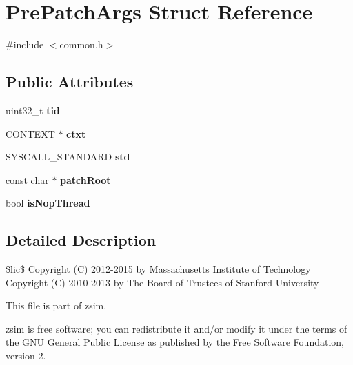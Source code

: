 \hypertarget{structPrePatchArgs}{\section{Pre\-Patch\-Args Struct Reference}
\label{structPrePatchArgs}
}


{\ttfamily \#include $<$common.\-h$>$}

\subsection*{Public Attributes}
\begin{DoxyCompactItemize}
\item 
\hypertarget{structPrePatchArgs_a49fba3fbedfef437698f149b07a60361}{uint32\-\_\-t {\bfseries tid}}\label{structPrePatchArgs_a49fba3fbedfef437698f149b07a60361}

\item 
\hypertarget{structPrePatchArgs_affd3d4a3b3601033eea574e76b12743b}{C\-O\-N\-T\-E\-X\-T $\ast$ {\bfseries ctxt}}\label{structPrePatchArgs_affd3d4a3b3601033eea574e76b12743b}

\item 
\hypertarget{structPrePatchArgs_a3fecf0e133ece9160b17ad82d711667b}{S\-Y\-S\-C\-A\-L\-L\-\_\-\-S\-T\-A\-N\-D\-A\-R\-D {\bfseries std}}\label{structPrePatchArgs_a3fecf0e133ece9160b17ad82d711667b}

\item 
\hypertarget{structPrePatchArgs_a42e1c776fb67eb8879f9e8b412bd559c}{const char $\ast$ {\bfseries patch\-Root}}\label{structPrePatchArgs_a42e1c776fb67eb8879f9e8b412bd559c}

\item 
\hypertarget{structPrePatchArgs_a54552ce242df01215b66292a16b84156}{bool {\bfseries is\-Nop\-Thread}}\label{structPrePatchArgs_a54552ce242df01215b66292a16b84156}

\end{DoxyCompactItemize}


\subsection{Detailed Description}
\$lic\$ Copyright (C) 2012-\/2015 by Massachusetts Institute of Technology Copyright (C) 2010-\/2013 by The Board of Trustees of Stanford University

This file is part of zsim.

zsim is free software; you can redistribute it and/or modify it under the terms of the G\-N\-U General Public License as published by the Free Software Foundation, version 2.

